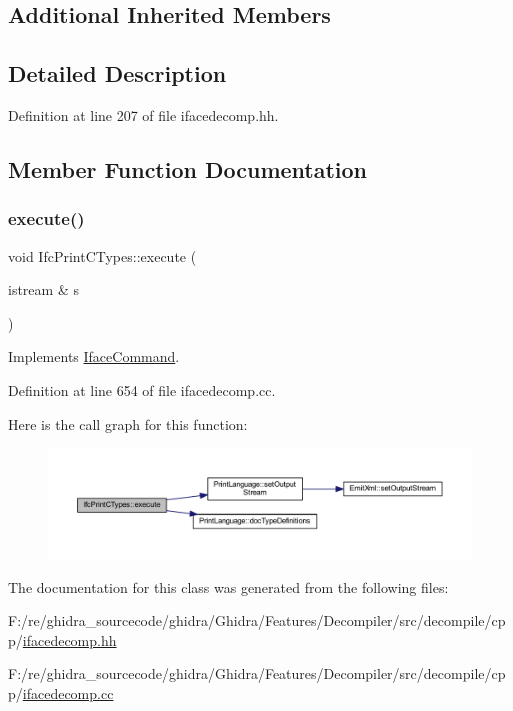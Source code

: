 \subsection*{Additional Inherited Members}


\subsection{Detailed Description}


Definition at line 207 of file ifacedecomp.\+hh.



\subsection{Member Function Documentation}
\mbox{\label{class_ifc_print_c_types_a9f3c59436d04440a92041c217ddc7454}} 
\subsubsection{\texorpdfstring{execute()}{execute()}}
{\footnotesize\ttfamily void Ifc\+Print\+C\+Types\+::execute (\begin{DoxyParamCaption}\item[{istream \&}]{s }\end{DoxyParamCaption})\hspace{0.3cm}{\ttfamily [virtual]}}



Implements \mbox{\hyperlink{class_iface_command_af10e29cee2c8e419de6efe9e680ad201}{Iface\+Command}}.



Definition at line 654 of file ifacedecomp.\+cc.

Here is the call graph for this function\+:
\nopagebreak
\begin{figure}[H]
\begin{center}
\leavevmode
\includegraphics[width=350pt]{class_ifc_print_c_types_a9f3c59436d04440a92041c217ddc7454_cgraph}
\end{center}
\end{figure}


The documentation for this class was generated from the following files\+:\begin{DoxyCompactItemize}
\item 
F\+:/re/ghidra\+\_\+sourcecode/ghidra/\+Ghidra/\+Features/\+Decompiler/src/decompile/cpp/\mbox{\hyperlink{ifacedecomp_8hh}{ifacedecomp.\+hh}}\item 
F\+:/re/ghidra\+\_\+sourcecode/ghidra/\+Ghidra/\+Features/\+Decompiler/src/decompile/cpp/\mbox{\hyperlink{ifacedecomp_8cc}{ifacedecomp.\+cc}}\end{DoxyCompactItemize}

